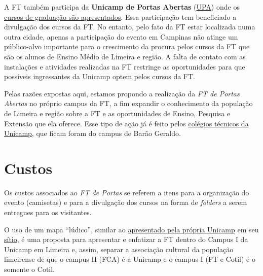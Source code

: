 \documentclass[
  letterpaper,
  DIV=11,
  numbers=noendperiod,
  oneside]{scrreprt}
\begin{document}
A FT também participa da \textbf{Unicamp de Portas Abertas}
(\href{https://upa.unicamp.br/}{UPA}) onde os
\href{https://wordpress.ft.unicamp.br/upa/}{cursos de graduação são
apresentados}. Essa participação tem beneficiado a divulgação dos cursos
da FT. No entanto, pelo fato da FT estar localizada numa outra cidade,
apenas a participação do evento em Campinas não atinge um público-alvo
importante para o crescimento da procura pelos cursos da FT que são os
alunos de Ensino Médio de Limeira e região. A falta de contato com as
instalações e atividades realizadas na FT restringe as oportunidades
para que possíveis ingressantes da Unicamp optem pelos cursos da FT.

Pelas razões expostas aqui, estamos propondo a realização da \emph{FT de
Portas Abertas} no próprio campus da FT, a fim expandir o conhecimento
da população de Limeira e região sobre a FT e as oportunidades de
Ensino, Pesquisa e Extensão que ela oferece. Esse tipo de ação já é
feito pelos
\href{https://unicamp.br/noticias/2024/07/24/colegios-tecnicos-da-unicamp-abrem-portas-para-novos-estudantes/}{colégios
técnicos da Unicamp}, que ficam foram do campus de Barão Geraldo.


\chapter{Custos}\label{custos}

Os custos associados ao \emph{FT de Portas} se referem a itens para a
organização do evento (camisetas) e para a divulgação dos cursos na
forma de \emph{folders} a serem entregues para os visitantes.

O uso de um mapa ``lúdico'', similar ao
\href{https://internationaloffice.unicamp.br/wp-content/uploads/sites/26/2023/10/MAPA-BARAO-GERALDO-baixa.jpg\#/home}{apresentado
pela própria Unicamp} em seu
\href{https://unicamp.br/unicamp/mapas/}{sítio}, é uma proposta para
apresentar e enfatizar a FT dentro do Campus I da Unicamp em Limeira e,
assim, separar a associação cultural da população limeirense de que o
campus II (FCA) é a Unicamp e o campus I (FT e Cotil) é o somente o
Cotil.
\end{document}
